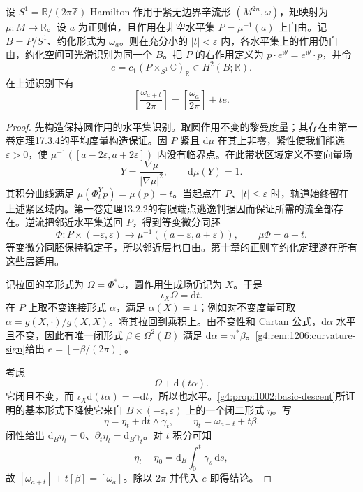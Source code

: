 \begin{theorem}\label{g4:thm:1206:reduced-class-variation}
	设 \(S^1=\mathbb R/(2\pi\mathbb Z)\) Hamilton 作用于紧无边界辛流形 \((M^{2n},\omega)\)，矩映射为 \(\mu:M\to\mathbb R\)。设 \(a\) 为正则值，且作用在非空水平集 \(P=\mu^{-1}(a)\) 上自由。记 \(B=P/S^1\)、约化形式为 \(\omega_a\)。则在充分小的 \(|t|<\varepsilon\) 内，各水平集上的作用仍自由，约化空间可光滑识别为同一个 \(B\)。把 \(P\) 的右作用定义为 \(p\cdot e^{\mathrm{i}\theta}=e^{\mathrm{i}\theta}\cdot p\)，并令
	\[
		e=c_1(P\times_{S^1}\mathbb C)_{\mathbb R}\in H^2(B;\mathbb R).
	\]
	在上述识别下有
	\begin{equation}\label{g4:eq:1206:dh-class}
		\left[\frac{\omega_{a+t}}{2\pi}\right]
		=\left[\frac{\omega_a}{2\pi}\right]+t e.
	\end{equation}
\end{theorem}
\begin{proof}
	先构造保持圆作用的水平集识别。取圆作用不变的黎曼度量；其存在由第一卷定理17.3.4的平均度量构造保证。因 \(P\) 紧且 \(\mathrm{d}\mu\) 在其上非零，紧性使我们能选 \(\varepsilon>0\)，使 \(\mu^{-1}([a-2\varepsilon,a+2\varepsilon])\) 内没有临界点。在此带状区域定义不变向量场
	\[
		Y=\frac{\nabla\mu}{|\nabla\mu|^2},
		\qquad \mathrm{d}\mu(Y)=1.
	\]
	其积分曲线满足 \(\mu(\Phi_t^Yp)=\mu(p)+t\)。当起点在 \(P\)、\(|t|\le\varepsilon\) 时，轨道始终留在上述紧区域内。第一卷定理13.2.2的有限端点逃逸判据因而保证所需的流全部存在。逆流把邻近水平集送回 \(P\)，得到等变微分同胚
	\[
		\Phi:P\times(-\varepsilon,\varepsilon)
		\longrightarrow\mu^{-1}((a-\varepsilon,a+\varepsilon)),
		\qquad \mu\Phi=a+t.
	\]
	等变微分同胚保持稳定子，所以邻近层也自由。第十章的正则辛约化定理遂在所有这些层适用。

	记拉回的辛形式为 \(\Omega=\Phi^*\omega\)，圆作用生成场仍记为 \(X\)。于是
	\[
		\iota_X\Omega=\mathrm{d}t.
	\]
	在 \(P\) 上取不变连接形式 \(\alpha\)，满足 \(\alpha(X)=1\)；例如对不变度量可取 \(\alpha=g(X,\cdot)/g(X,X)\)。将其拉回到乘积上。由不变性和 Cartan 公式，\(\mathrm{d}\alpha\) 水平且不变，因此有唯一闭形式 \(\beta\in\Omega^2(B)\) 满足 \(\mathrm{d}\alpha=\pi^*\beta\)。\cref{g4:rem:1206:curvature-sign}给出 \(e=[-\beta/(2\pi)]\)。

	考虑
	\[
		\Omega+\mathrm{d}(t\alpha).
	\]
	它闭且不变，而
	\(\iota_X\mathrm{d}(t\alpha)=-\mathrm{d}t\)，所以也水平。\cref{g4:prop:1002:basic-descent}所证明的基本形式下降使它来自 \(B\times(-\varepsilon,\varepsilon)\) 上的一个闭二形式 \(\eta\)。写
	\[
		\eta=\eta_t+\mathrm{d}t\wedge\gamma_t,
		\qquad
		\eta_t=\omega_{a+t}+t\beta.
	\]
	闭性给出 \(\mathrm{d}_B\eta_t=0\)、\(\partial_t\eta_t=\mathrm{d}_B\gamma_t\)。对 \(t\) 积分可知
	\[
		\eta_t-\eta_0
		=\mathrm{d}_B\int_0^t\gamma_s\,\mathrm{d}s,
	\]
	故 \([\omega_{a+t}]+t[\beta]=[\omega_a]\)。除以 \(2\pi\) 并代入 \(e\) 即得结论。
\end{proof}

